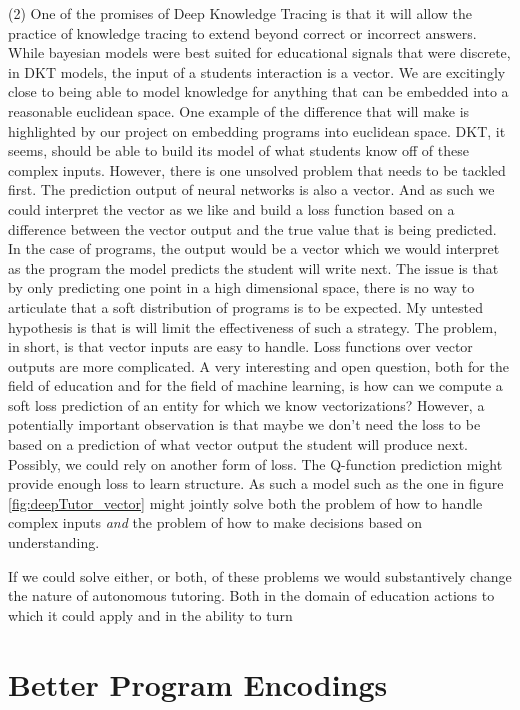 (2) One of the promises of Deep Knowledge Tracing is that it will allow the practice of knowledge tracing to extend beyond correct or incorrect answers. While bayesian models were best suited for educational signals that were discrete, in DKT models, the input of a students interaction is a vector. We are excitingly close to being able to model knowledge for anything that can be embedded into a reasonable euclidean space. One example of the difference that will make is highlighted by our project on embedding programs into euclidean space. DKT, it seems, should be able to build its model of what students know off of these complex inputs. However, there is one unsolved problem that needs to be tackled first. The prediction output of neural networks is also a vector. And as such we could interpret the vector as we like and build a loss function based on a difference between the vector output and the true value that is being predicted. In the case of programs, the output would be a vector which we would interpret as the program the model predicts the student will write next. The issue is that by only predicting one point in a high dimensional space, there is no way to articulate that a soft distribution of programs is to be expected. My untested hypothesis is that is will limit the effectiveness of such a strategy. The problem, in short, is that vector inputs are easy to handle. Loss functions over vector outputs are more complicated. A very interesting and open question, both for the field of education and for the field of machine learning, is how can we compute a soft loss prediction of an entity for which we know vectorizations? 
However, a potentially important observation is that maybe we don't need the loss to be based on a prediction of what vector output the student will produce next. Possibly, we could rely on another form of loss. The Q-function prediction might provide enough loss to learn structure. As such a model such as the one in figure \ref{fig:deepTutor_vector} might jointly solve both the problem of how to handle complex inputs \emph{and} the problem of how to make decisions based on understanding.

If we could solve either, or both, of these problems we would substantively change the nature of autonomous tutoring. Both in the domain of education actions to which it could apply and in the ability to turn 

\section{Better Program Encodings}

